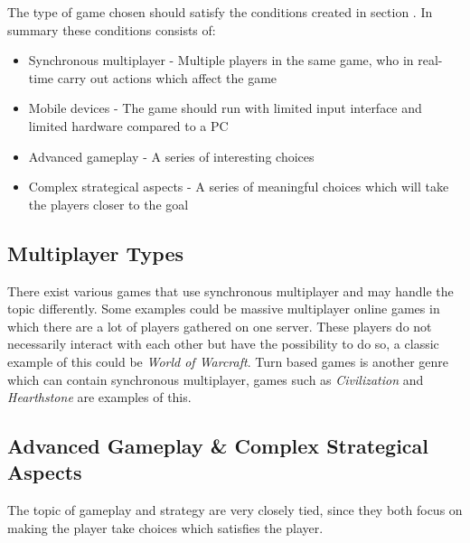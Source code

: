 The type of game chosen should satisfy the conditions created in section \cite{sec:specifyingtheproblemstatement}.
In summary these conditions consists of:
\begin{itemize}
\item Synchronous multiplayer - Multiple players in the same game, who in real-time carry out actions which affect the game
\item Mobile devices - The game should run with limited input interface and limited hardware compared to a PC
\item Advanced gameplay - A series of interesting choices
\item Complex strategical aspects - A series of meaningful choices which will take the players closer to the goal
\end{itemize}

\subsection{Multiplayer Types}
There exist various games that use synchronous multiplayer and may handle the topic differently. 
Some examples could be massive multiplayer online games in which there are a lot of players gathered on one server.
These players do not necessarily interact with each other but have the possibility to do so, a classic example of this could be \textit{World of Warcraft}\cite{wow}. 
Turn based games is another genre which can contain synchronous multiplayer, games such as \textit{Civilization} and \textit{Hearthstone}\cite{hearthstone} are examples of this. 

\subsection{Advanced Gameplay \& Complex Strategical Aspects}
The topic of gameplay and strategy are very closely tied, since they both focus on making the player take choices which satisfies the player.

